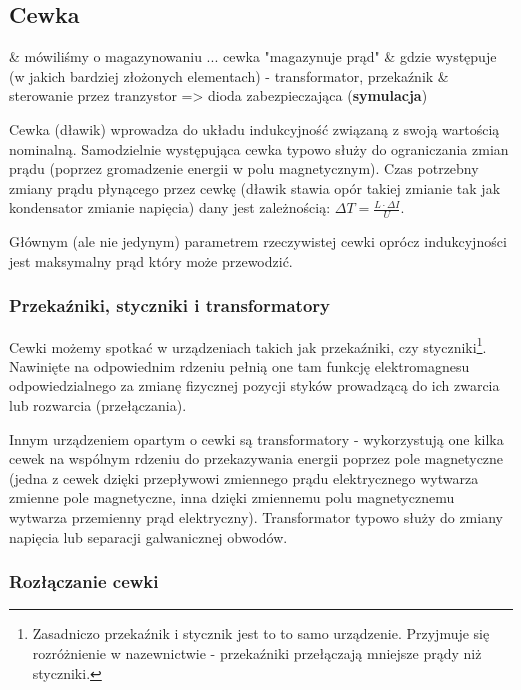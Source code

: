\documentclass{pdfBooklets}
\begin{document}
\subsection{Cewka}
\begin{teacherOnly}
	\begin{easylist}[itemize]
		& mówiliśmy o magazynowaniu ... cewka "magazynuje prąd"
		& gdzie występuje (w jakich bardziej złożonych elementach) - transformator, przekaźnik
		& sterowanie przez tranzystor => dioda zabezpieczająca (\textbf{symulacja})
	\end{easylist}
\end{teacherOnly}

Cewka (dławik) wprowadza do układu indukcyjność związaną z swoją wartością nominalną. Samodzielnie występująca cewka typowo służy do ograniczania zmian prądu (poprzez gromadzenie energii w polu magnetycznym). Czas potrzebny zmiany prądu płynącego przez cewkę (dławik stawia opór takiej zmianie tak jak kondensator zmianie napięcia) dany jest zależnością: $\Delta T = \frac{L \cdot \Delta I}{U}$.

Głównym (ale nie jedynym) parametrem rzeczywistej cewki oprócz indukcyjności jest maksymalny prąd który może przewodzić.

\subsubsection{Przekaźniki, styczniki i transformatory}

Cewki możemy spotkać w urządzeniach takich jak przekaźniki, czy styczniki\footnote{Zasadniczo przekaźnik i stycznik jest to to samo urządzenie. Przyjmuje się rozróżnienie w nazewnictwie - przekaźniki przełączają mniejsze prądy niż styczniki.}.
Nawinięte na odpowiednim rdzeniu pełnią one tam funkcję elektromagnesu odpowiedzialnego za zmianę fizycznej pozycji styków prowadzącą do ich zwarcia lub rozwarcia (przełączania).

Innym urządzeniem opartym o cewki są transformatory - wykorzystują one kilka cewek na wspólnym rdzeniu do przekazywania energii poprzez pole magnetyczne (jedna z cewek dzięki przepływowi zmiennego prądu elektrycznego wytwarza zmienne pole magnetyczne, inna dzięki zmiennemu polu magnetycznemu wytwarza przemienny prąd elektryczny). Transformator typowo służy do zmiany napięcia lub separacji galwanicznej obwodów.

\subsubsection{Rozłączanie cewki}
\end{document}
